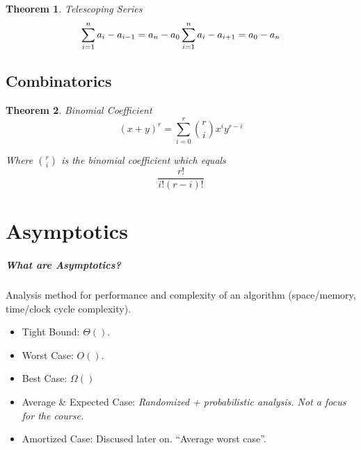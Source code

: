\documentclass[a4paper,12pt]{report}
\newtheorem{theorem}{Theorem}
\begin{document}
\begin{theorem}{Telescoping Series}
\begin{equation}
\sum_{i=1}^{n} a_i - a_{i-1} = a_n - a_0 \\
\sum_{i = 1}^{n} a_i - a_{i+1} = a_0 - a_n
\end{equation}
\end{theorem}


\section{Combinatorics}

\begin{theorem}{Binomial Coefficient}
\begin{equation}
(x+y)^r = \sum_{i = 0}^{r} {r\choose i} x^i y^{r-i}
\end{equation}

Where $r\choose i$ is the binomial coefficient which equals $$\frac{r!}{i!(r-i)!}$$

\end{theorem}




\chapter{Asymptotics}

\paragraph{What are Asymptotics? } Analysis method for performance and complexity of an algorithm (space/memory, time/clock cycle complexity).

\begin{itemize}
\item Tight Bound: $\Theta()$.
\item Worst Case: $O()$.
\item Best Case: $\Omega()$
\item Average \& Expected Case: \textit{Randomized + probabilistic analysis. Not a focus for the course.} 
\item Amortized Case: Discused later on. ``Average worst case''.
\end{itemize}
\end{document}
